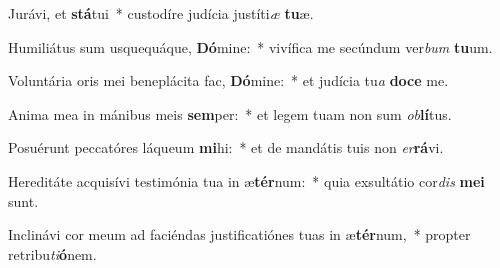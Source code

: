 \item Jurávi, et \textbf{stá}tui~* custodíre judícia justíti\textit{æ} \textbf{tu}æ.
\item Humiliátus sum usquequáque, \textbf{Dó}mine:~* vivífica me secúndum ver\textit{bum} \textbf{tu}um.
\item Voluntária oris mei beneplácita fac, \textbf{Dó}mine:~* et judícia tu\textit{a} \textbf{do}\textbf{ce} me.
\item Anima mea in mánibus meis \textbf{sem}per:~* et legem tuam non sum \textit{ob}\textbf{lí}tus.
\item Posuérunt peccatóres láqueum \textbf{mi}hi:~* et de mandátis tuis non \textit{er}\textbf{rá}vi.
\item Hereditáte acquisívi testimónia tua in æ\textbf{tér}num:~* quia exsultátio cor\textit{dis} \textbf{me}\textbf{i} sunt.
\item Inclinávi cor meum ad faciéndas justificatiónes tuas in æ\textbf{tér}num,~* propter retribu\textit{ti}\textbf{ó}nem.
